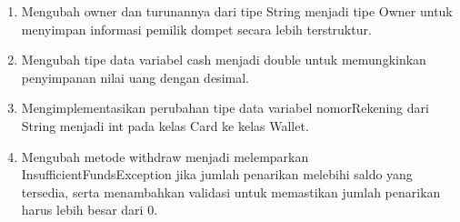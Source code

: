 \documentclass[a4paper,12pt]{article}
\begin{document}
\begin{enumerate}
    \item Mengubah owner dan turunannya dari tipe String menjadi tipe Owner untuk menyimpan informasi pemilik dompet secara lebih terstruktur.
    \item Mengubah tipe data variabel cash menjadi double untuk memungkinkan penyimpanan nilai uang dengan desimal.
    \item Mengimplementasikan perubahan tipe data variabel nomorRekening dari String menjadi int pada kelas Card ke kelas Wallet.
    \item Mengubah metode withdraw menjadi melemparkan InsufficientFundsException jika jumlah penarikan melebihi saldo yang tersedia, serta menambahkan validasi untuk memastikan jumlah penarikan harus lebih besar dari 0.
\end{enumerate}
\end{document}
